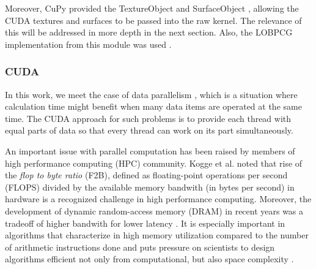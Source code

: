 \vspace{0.2cm}


Moreover, CuPy provided the TextureObject \cite{cupy_texture} and SurfaceObject \cite{cupy_surface}, allowing the CUDA textures and surfaces to be passed into the raw kernel. The relevance of this will be addressed in more depth in the next section. Also, the LOBPCG implementation from this module was used \cite{cupy_lobpcg}.


\subsubsection{CUDA}

In this work, we meet the case of data parallelism \cite{cheng2014professional}, which is a situation where calculation time might benefit when many data items are operated at the same time. The CUDA approach for such problems is to provide each thread with equal parts of data so that every thread can work on its part simultaneously.

An important issue with parallel computation has been raised by members of high performance computing (HPC) community. Kogge et al. noted that rise of the \textit{flop to byte ratio} (F2B), defined as floating-point operations per second (FLOPS) divided by the available memory bandwith (in bytes per second) in hardware is a recognized challenge in high performance computing. Moreover, the development of dynamic random-access memory (DRAM) in recent years was a tradeoff of higher bandwith for lower latency \cite{kogge2008exascale}. It is especially important in algorithms that characterize in high memory utilization compared to the number of arithmetic instructions done and puts pressure on scientists to design algorithms efficient not only from computational, but also space complexity \cite{krotkiewski2011efficient}.

\vspace{0.2cm}

